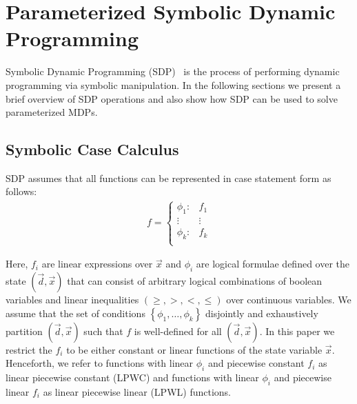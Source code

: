 \section{Parameterized Symbolic Dynamic Programming}
\label{sec:sdp}

Symbolic Dynamic Programming (SDP)~\parencite{Boutilier_IJCAI_2001} is the process of performing dynamic programming
via symbolic manipulation. In the following sections we present a brief overview of SDP operations and also show
how SDP can be used to solve parameterized MDPs.

\subsection{Symbolic Case Calculus}

SDP assumes that all functions can be represented in case statement form \parencite{Boutilier_IJCAI_2001} as follows:
{\footnotesize 
    \abovedisplayskip=5pt
    \belowdisplayskip=0pt
    \begin{align*}
        f = 
        \begin{cases}
            \phi_1: & f_1 \\ 
            \vdots & \vdots\\ 
            \phi_k: & f_k \\ 
        \end{cases}
    \end{align*}
}%

Here, {\footnotesize$ f_i $} are linear expressions over {\footnotesize$ \vec{x} $} and {\footnotesize$\phi_i$} are logical formulae defined over the state {\footnotesize$( \vec{d}, \vec{x})$} that can consist of arbitrary logical combinations of boolean variables and linear inequalities {\footnotesize$\left( \geq, >, <, \leq \right)$} over continuous variables. We assume that the set of conditions {\footnotesize$\left\lbrace \phi_1, \ldots, \phi_k \right\rbrace$} disjointly and exhaustively partition {\footnotesize$(\vec{d}, \vec{x})$} such that {\footnotesize$f$} is well-defined for all {\footnotesize$(\vec{d}, \vec{x})$}. In this paper we restrict the {\footnotesize$f_i$} to be either constant or linear functions of the state variable {\footnotesize$\vec{x}$}. Henceforth, we refer to functions with linear {\footnotesize$\phi_i$} and piecewise constant {\footnotesize$f_i$} as linear piecewise constant (LPWC) and functions with linear {\footnotesize$\phi_i$} and piecewise linear {\footnotesize$f_i$} as linear piecewise linear (LPWL) functions.

